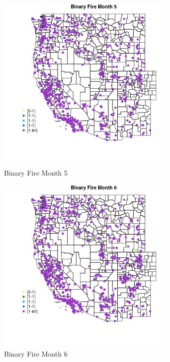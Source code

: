 \begin{figure} 
\centering  
\includegraphics[width=0.77\textwidth]{Code_Outputs/Report_ML_input_PM25_Step4_part_f_de_duplicated_aveswNAs_MapObsMo5Binary_Fire.jpg} 
\caption{\label{fig:Report_ML_input_PM25_Step4_part_f_de_duplicated_aveswNAsMapObsMo5Binary_Fire}Binary Fire Month 5} 
\end{figure} 
 

\begin{figure} 
\centering  
\includegraphics[width=0.77\textwidth]{Code_Outputs/Report_ML_input_PM25_Step4_part_f_de_duplicated_aveswNAs_MapObsMo6Binary_Fire.jpg} 
\caption{\label{fig:Report_ML_input_PM25_Step4_part_f_de_duplicated_aveswNAsMapObsMo6Binary_Fire}Binary Fire Month 6} 
\end{figure} 
 

